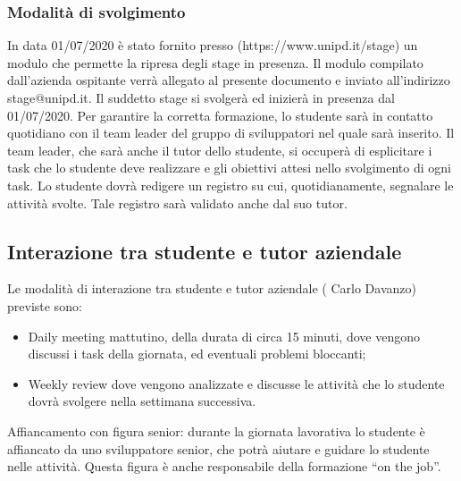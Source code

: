 
\subsubsection{Modalità di svolgimento}
In data 01/07/2020 è stato fornito presso (https://www.unipd.it/stage) un modulo che permette la ripresa degli stage in presenza. Il modulo compilato dall’azienda ospitante verrà allegato al presente documento e inviato all’indirizzo stage@unipd.it.
Il suddetto stage si svolgerà ed inizierà in presenza dal 01/07/2020. Per garantire la corretta formazione, lo studente sarà in contatto quotidiano con il team leader del gruppo di sviluppatori
nel quale sarà inserito. Il team leader, che sarà anche il tutor dello studente, si occuperà di
esplicitare i task che lo studente deve realizzare e gli obiettivi attesi nello svolgimento di ogni task.
Lo studente dovrà redigere un registro su cui, quotidianamente, segnalare le attività svolte. Tale
registro sarà validato anche dal suo tutor.

\subsection{Interazione tra studente e tutor aziendale}

Le modalità di interazione tra studente e tutor aziendale ( Carlo Davanzo) previste sono:
	\begin{itemize}
		\item Daily meeting mattutino, della durata di circa 15 minuti, dove vengono discussi i task della giornata, ed eventuali problemi bloccanti;
		\item Weekly review dove vengono analizzate e discusse le attività che lo studente dovrà svolgere nella settimana successiva.
	\end{itemize}
Affiancamento con figura senior: durante la giornata lavorativa lo studente è affiancato da uno sviluppatore senior, che potrà aiutare e guidare lo studente nelle attività. Questa figura è anche responsabile della formazione “on the job”.

\pagebreak
